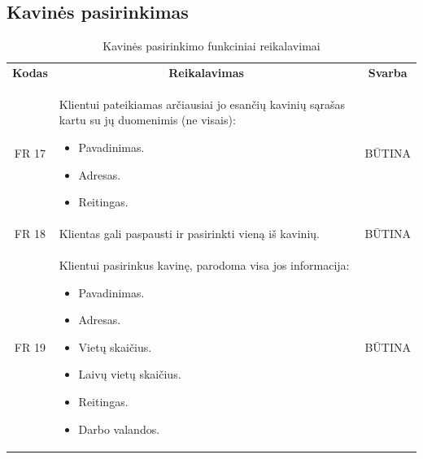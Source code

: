 \documentclass{VUMIFPSkursinis}
\begin{document}
{{{{{\begin{center}
\end{center}
\pagebreak

\subsection{Kavinės pasirinkimas}

\begin{center}
	\begin{table}[H]
	\caption{Kavinės pasirinkimo funkciniai reikalavimai}
	\begin{tabular}{|p{2cm}|p{}|p{}|}
	
	\hline
	    \rowcolor{lightgray}
		\multicolumn{3}{|c|}{Kavinės pasirinkimas}\\
		
	\hline
		\multicolumn{1}{|c|}{{\bfseries Kodas}}&
		\multicolumn{1}{|c|}{{\bfseries Reikalavimas}}&
		\multicolumn{1}{|c|}{{\bfseries Svarba}}\\

	\hline
	
		\multicolumn{1}{|c|}{FR 17}&
		{Klientui pateikiamas arčiausiai jo esančių kavinių sąrašas kartu su jų duomenimis (ne visais):
		\begin{itemize}
			\item Pavadinimas.
			\item Adresas.
			\item Reitingas.
		\end{itemize}}&
		\multicolumn{1}{|c|}{BŪTINA}\\	
		
	\hline
	
		\multicolumn{1}{|c|}{FR 18}&
		{Klientas gali paspausti ir pasirinkti vieną iš kavinių.}&
		\multicolumn{1}{|c|}{BŪTINA}\\
		
	\hline
	
		\multicolumn{1}{|c|}{FR 19}&
		{Klientui pasirinkus kavinę, parodoma visa jos informacija:
		\begin{itemize}
			\item Pavadinimas.
			\item Adresas.
			\item Vietų skaičius.
			\item Laivų vietų skaičius.
			\item Reitingas.
			\item Darbo valandos.
		\end{itemize}}&
		\multicolumn{1}{|c|}{BŪTINA}\\
		

\end{tabular}
\end{table}
\end{center}}}}}}
\end{document}
